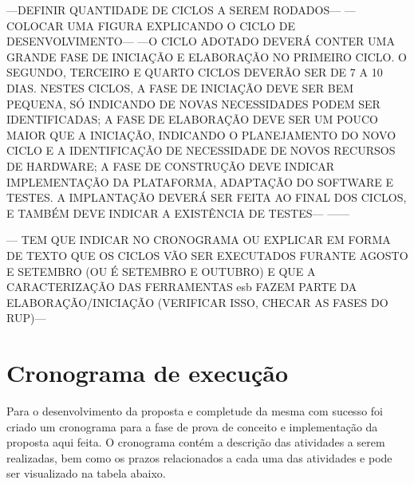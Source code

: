---DEFINIR QUANTIDADE DE CICLOS A SEREM RODADOS---
---COLOCAR UMA FIGURA EXPLICANDO O CICLO DE DESENVOLVIMENTO---
---O CICLO ADOTADO DEVERÁ CONTER UMA GRANDE FASE DE INICIAÇÃO E ELABORAÇÃO NO PRIMEIRO CICLO. O SEGUNDO, TERCEIRO E QUARTO CICLOS DEVERÃO SER DE 7 A 10 DIAS. NESTES CICLOS, A FASE DE INICIAÇÃO DEVE SER BEM PEQUENA, SÓ INDICANDO DE NOVAS NECESSIDADES PODEM SER IDENTIFICADAS; A FASE DE ELABORAÇÃO DEVE SER UM POUCO MAIOR QUE A INICIAÇÃO, INDICANDO O PLANEJAMENTO DO NOVO CICLO E A IDENTIFICAÇÃO DE NECESSIDADE DE NOVOS RECURSOS DE HARDWARE; A FASE DE CONSTRUÇÃO DEVE INDICAR IMPLEMENTAÇÃO DA PLATAFORMA, ADAPTAÇÃO DO SOFTWARE E TESTES. A IMPLANTAÇÃO DEVERÁ SER FEITA AO FINAL  DOS CICLOS, E TAMBÉM DEVE INDICAR A EXISTÊNCIA DE TESTES---
------



--- TEM QUE INDICAR NO CRONOGRAMA OU EXPLICAR EM FORMA DE TEXTO QUE OS CICLOS VÃO SER EXECUTADOS  FURANTE AGOSTO E SETEMBRO (OU É SETEMBRO E OUTUBRO) E QUE A CARACTERIZAÇÃO DAS FERRAMENTAS esb FAZEM PARTE DA ELABORAÇÃO/INICIAÇÃO (VERIFICAR ISSO, CHECAR AS FASES DO RUP)---

\section{Cronograma de execução}
Para o desenvolvimento da proposta e completude da mesma com sucesso foi criado um cronograma para a fase de prova de conceito e implementação da proposta aqui feita. O cronograma contém a descrição das atividades a serem realizadas, bem como os prazos relacionados a cada uma das atividades e pode ser visualizado na tabela abaixo.


